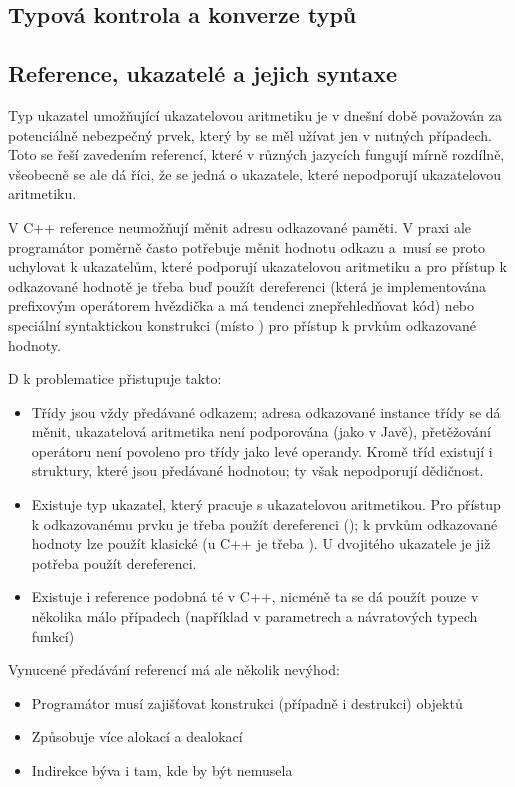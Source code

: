 \subsection{Typová kontrola a konverze typů} %


\subsection{Reference, ukazatelé a jejich syntaxe} \label{pointers}
Typ ukazatel umožňující ukazatelovou aritmetiku je v dnešní době považován za potenciálně nebezpečný prvek, který by se měl užívat jen v nutných případech. Toto se řeší zavedením referencí, které v různých jazycích fungují mírně rozdílně, všeobecně se ale dá říci, že se jedná o ukazatele, které nepodporují ukazatelovou aritmetiku.

V C++ reference neumožňují měnit adresu odkazované paměti. V praxi ale programátor poměrně často potřebuje měnit hodnotu odkazu a~musí se proto uchylovat k ukazatelům, které podporují ukazatelovou aritmetiku a pro přístup k odkazované hodnotě je třeba buď použít dereferenci (která je implementována prefixovým operátorem hvězdička a má tendenci znepřehledňovat kód) nebo speciální syntaktickou konstrukci (místo  ) pro přístup k prvkům odkazované hodnoty.

D k problematice přistupuje takto:
\begin{itemize}
	\item Třídy jsou vždy předávané odkazem; adresa odkazované instance třídy se dá měnit, ukazatelová aritmetika není podporována (jako v Javě), přetěžování operátoru  není povoleno pro třídy jako levé operandy. Kromě tříd existují i struktury, které jsou předávané hodnotou; ty však nepodporují dědičnost.
	\item Existuje typ ukazatel, který pracuje s ukazatelovou aritmetikou. Pro přístup k odkazovanému prvku je třeba použít dereferenci (); k prvkům odkazované hodnoty lze použít klasické  (u C++ je třeba ). U dvojitého ukazatele je již potřeba použít dereferenci.
	\item Existuje i reference podobná té v C++, nicméně ta se dá použít pouze v několika málo případech (například v parametrech a návratových typech funkcí)
\end{itemize}

Vynucené předávání referencí má ale několik nevýhod:
\begin{itemize}
	\item Programátor musí zajišťovat konstrukci (případně i destrukci) objektů
	\item Způsobuje více alokací a dealokací
	\item Indirekce býva i tam, kde by být nemusela
\end{itemize}

